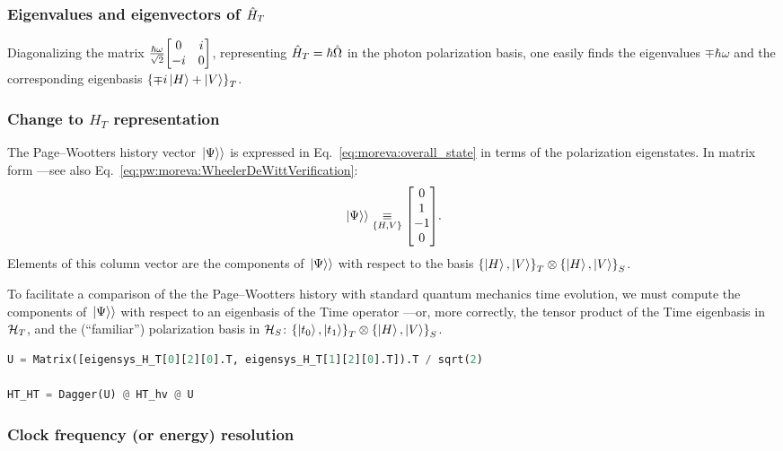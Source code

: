 \subsubsection*{Eigenvalues and eigenvectors of $\hat{H}_T$}

Diagonalizing the matrix $\frac{\hbar\omega}{\sqrt{2}}\mqty[0 &i\\-i &0]$,
representing $\hat{H}_T = \hbar\hat{\Omega}$ in the photon polarization basis,
one easily finds the eigenvalues $\mp\hbar\omega$ and the corresponding eigenbasis 
$\left\{\mp i \ket{H} + \ket{V}\right\}_T$.

\subsubsection*{Change to $H_T$ representation}

The Page--Wootters history vector $\left.\left| \Psi \right\rangle\right\rangle$ is expressed in Eq.~\eqref{eq:moreva:overall_state}
in terms of the polarization eigenstates. In matrix form ---see also Eq.~\eqref{eq:pw:moreva:WheelerDeWittVerification}:
\begin{equation}
  \dket{\Psi} \repr[\setof{H, V}] \mqty[0 \\ 1 \\ -1 \\ 0] \text{.}
\end{equation}
Elements of this column vector are the components of $\left.\left| \Psi \right\rangle\right\rangle$
with respect to the basis $\left\{\ket{H}, \ket{V}\right\}_T \otimes \left\{\ket{H}, \ket{V}\right\}_S$.

To facilitate a comparison of the the Page--Wootters history with standard quantum mechanics time evolution,
we must compute the components of $\left.\left| \Psi \right\rangle\right\rangle$ with respect to an eigenbasis of the Time operator
---or, more correctly, the tensor product of the Time eigenbasis in $\mathcal{H}_T$,
and the (``familiar'') polarization basis in $\mathcal{H}_S$: $\left\{\ket{t_0}, \ket{t_1}\right\}_T \otimes \left\{\ket{H}, \ket{V}\right\}_S$.

\begin{lstlisting}[language=Python]
U = Matrix([eigensys_H_T[0][2][0].T, eigensys_H_T[1][2][0].T]).T / sqrt(2)

HT_HT = Dagger(U) @ HT_hv @ U
\end{lstlisting}

\subsubsection*{Clock frequency (or energy) resolution}

